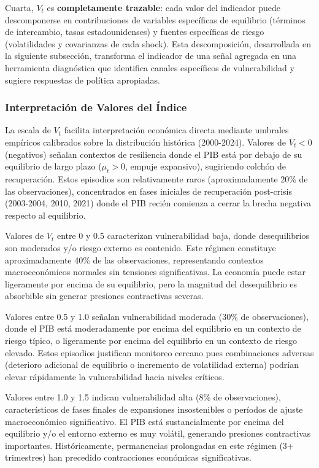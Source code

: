\documentclass[3p,11pt,draft,natbib=false]{elsarticle}
\begin{document}
Cuarta, $V_t$ es \textbf{completamente trazable}: cada valor del indicador puede descomponerse en contribuciones de variables específicas de equilibrio (términos de intercambio, tasas estadounidenses) y fuentes específicas de riesgo (volatilidades y covarianzas de cada shock). Esta descomposición, desarrollada en la siguiente subsección, transforma el indicador de una señal agregada en una herramienta diagnóstica que identifica canales específicos de vulnerabilidad y sugiere respuestas de política apropiadas.

\subsubsection{Interpretación de Valores del Índice}

La escala de $V_t$ facilita interpretación económica directa mediante umbrales empíricos calibrados sobre la distribución histórica (2000-2024). Valores de $V_t < 0$ (negativos) señalan contextos de resiliencia donde el PIB está por debajo de su equilibrio de largo plazo ($\mu_t > 0$, empuje expansivo), sugiriendo colchón de recuperación. Estos episodios son relativamente raros (aproximadamente 20\% de las observaciones), concentrados en fases iniciales de recuperación post-crisis (2003-2004, 2010, 2021) donde el PIB recién comienza a cerrar la brecha negativa respecto al equilibrio.

Valores de $V_t$ entre 0 y 0.5 caracterizan vulnerabilidad baja, donde desequilibrios son moderados y/o riesgo externo es contenido. Este régimen constituye aproximadamente 40\% de las observaciones, representando contextos macroeconómicos normales sin tensiones significativas. La economía puede estar ligeramente por encima de su equilibrio, pero la magnitud del desequilibrio es absorbible sin generar presiones contractivas severas.

Valores entre 0.5 y 1.0 señalan vulnerabilidad moderada (30\% de observaciones), donde el PIB está moderadamente por encima del equilibrio en un contexto de riesgo típico, o ligeramente por encima del equilibrio en un contexto de riesgo elevado. Estos episodios justifican monitoreo cercano pues combinaciones adversas (deterioro adicional de equilibrio o incremento de volatilidad externa) podrían elevar rápidamente la vulnerabilidad hacia niveles críticos.

Valores entre 1.0 y 1.5 indican vulnerabilidad alta (8\% de observaciones), característicos de fases finales de expansiones insostenibles o períodos de ajuste macroeconómico significativo. El PIB está sustancialmente por encima del equilibrio y/o el entorno externo es muy volátil, generando presiones contractivas importantes. Históricamente, permanencias prolongadas en este régimen (3+ trimestres) han precedido contracciones económicas significativas.
\end{document}
